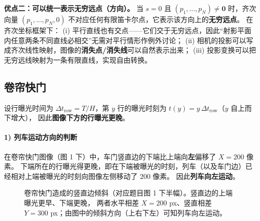 \documentclass[11pt,a4paper]{ctexart}
\begin{document}
\textbf{优点二：可以统一表示无穷远点（方向）。}
当 $s=0$ 且 $(p_1,\dots,p_N)\neq\mathbf 0$ 时，齐次向量 $(p_1,\dots,p_N,0)$ 不对应任何有限笛卡尔点，它表示该方向上的\textbf{无穷远点}。
在齐次坐标框架下：
(i) 平行直线也有交点——它们交于无穷远点，因此“射影平面内任意两条不同直线必相交”无需对平行情形作例外讨论；
(ii) 相机的投影可以写成齐次线性映射，图像的\textbf{消失点/消失线}可以自然表示出来；
(iii) 投影变换可以把无穷远线映射为一条有限直线，实现自由转换。

\subsection{卷帘快门}

设行曝光时间为 $\Delta t_{\text{row}}=T/H$，第 $y$ 行的曝光时刻为 $t(y)=y\,\Delta t_{\text{row}}$（$y$ 自上而下增大），
因此\textbf{图像下方的行曝光更晚}。

\paragraph{1) 列车运动方向的判断}

在卷帘快门图像（图 1 下）中，车门竖直边的下端比上端向\textbf{左}偏移了 $X=200$ 像素。
下端所在的行曝光得更晚，即在下端被曝光的时刻，列车（以及车门边）已经相对上端被曝光的时刻向图像左侧移动了 $200$ 像素。
因此\textbf{列车向左运动}。

\begin{figure}[H]
\centering
{}
\caption{卷帘快门造成的竖直边倾斜（对应题目图 1 下半幅）。竖直边的上端曝光更早、下端更晚，
两者水平相差 $X=200$ px、竖直相差 $Y=300$ px；由图中的倾斜方向（上右下左）可知列车向左运动。}
\end{figure}
\end{document}
